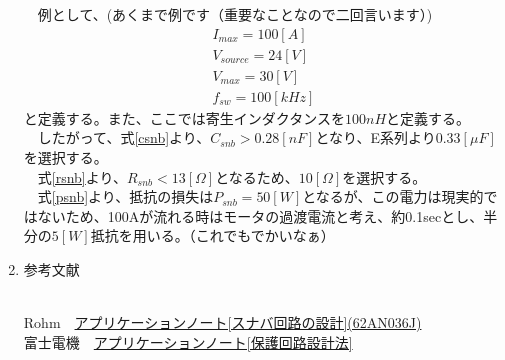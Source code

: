 \documentclass[12pt,a4paper,dvipdfmx]{jarticle}
\begin{document}
\begin{enumerate}
		　例として、(あくまで例です（重要なことなので二回言います）)
		\begin{eqnarray}
			I_{max} = 100 [A]\\
			V_{source} = 24 [V]\\
			V_{max} = 30 [V]\\
			f_{sw} = 100 [kHz]
		\end{eqnarray}
		と定義する。また、ここでは寄生インダクタンスを$100nH$と定義する。\\
		　したがって、式\ref{csnb}より、$C_{snb}　> 0.28 [nF]$となり、E系列より$0.33[\mu F]$を選択する。\\
		 　式\ref{rsnb}より、$R_{snb} < 13 [\Omega]$となるため、$10 [\Omega]$を選択する。\\
		 　式\ref{psnb}より、抵抗の損失は$P_{snb} = 50[W]$となるが、この電力は現実的ではないため、100Aが流れる時はモータの過渡電流と考え、約0.1secとし、半分の$5[W]$抵抗を用いる。（これでもでかいなぁ）
	\item \hypertarget{section4}{参考文献}\\
		Rohm　\href{https://fscdn.rohm.com/jp/products/databook/applinote/discrete/sic/mosfet/sic-mos_snubber_circuit_design_an-j.pdf}{アプリケーションノート[スナバ回路の設計](62AN036J)}\\
		富士電機　\href{https://www.fujielectric.co.jp/products/semiconductor/model/igbt/application/igbt.html}{アプリケーションノート[保護回路設計法]}
		
\end{enumerate}
\end{document}

